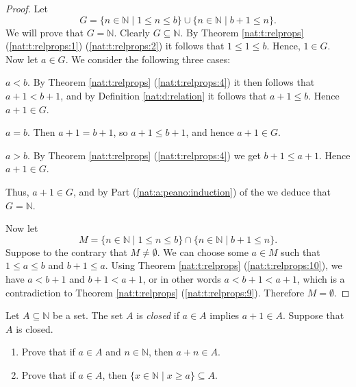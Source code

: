 \begin{proof}
	Let
	$$
		G = \{n \in \mathbb{N} \mid 1 \leq n \leq b\} \cup\{n \in \mathbb{N} \mid b+1 \leq n\}.
	$$
	We will prove that $G = \mathbb{N}$. Clearly $G \subseteq \mathbb{N}$. By Theorem \ref{nat:t:relprops} (\ref{nat:t:relprops:1}) (\ref{nat:t:relprops:2}) it follows that $1 \leq 1 \leq b$. Hence, $1 \in G$. Now let $a \in G$. We consider the following three cases:
	\begin{bycases}
		\item $a < b$. By Theorem \ref{nat:t:relprops} (\ref{nat:t:relprops:4}) it then follows that $a + 1 < b + 1$, and by Definition \ref{nat:d:relation} it follows that $a + 1 \leq b$. Hence $a + 1 \in G$.
		\item $a = b$. Then $a + 1 = b + 1$, so $a + 1 \leq b + 1$, and hence $a + 1 \in G$.
		\item $a > b$. By Theorem \ref{nat:t:relprops} (\ref{nat:t:relprops:4}) we get $b + 1 \leq a + 1$. Hence $a + 1 \in G$.
	\end{bycases}
	Thus, $a + 1 \in G$, and by Part (\ref{nat:a:peano:induction}) of the  we deduce that $G = \mathbb{N}$.

	Now let
	$$
		M = \{n \in \mathbb{N} \mid 1 \leq n \leq b\} \cap\{n \in \mathbb{N} \mid b+1 \leq n\}.
	$$
	Suppose to the contrary that $M \not= \emptyset$. We can choose some $a \in M$ such that $1 \leq a \leq b$ and $b + 1 \leq a$. Using Theorem \ref{nat:t:relprops} (\ref{nat:t:relprops:10}), we have $a < b + 1$ and $b + 1 < a + 1$, or in other words $a < b + 1 < a + 1$, which is a contradiction to Theorem \ref{nat:t:relprops} (\ref{nat:t:relprops:9}). Therefore $M = \emptyset$.
\end{proof}


\Newpage
\begin{exercise} %
	Let $A \subseteq \mathbb{N}$ be a set. The set $A$ is \emph{closed} if $a \in A$ implies $a + 1 \in A$. Suppose that $A$ is closed.
	\begin{enumerate}
		\item \label{nat:e:7:1}
		      Prove that if $a \in A$ and $n \in \mathbb{N}$, then $a +n  \in A$.
		\item \label{nat:e:7:2}
		      Prove that if $a \in A$, then $\{x \in \mathbb{N} \mid x \geq a\} \subseteq A$.
	\end{enumerate}
\end{exercise}

